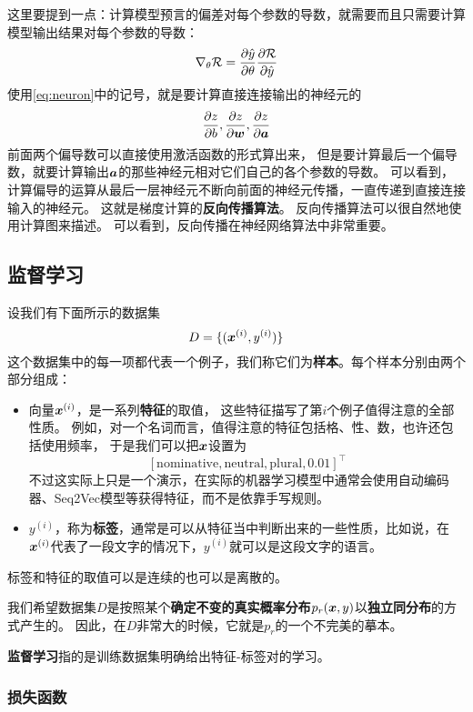 \documentclass[UTF8, a4paper]{ctexart}
\begin{document}
这里要提到一点：计算模型预言的偏差对每个参数的导数，就需要而且只需要计算模型输出结果对每个参数的导数：
\[
    \nabla_\theta \mathcal{R} = \pdv{\hat{y}}{\theta} \pdv{\mathcal{R}}{\hat{y}}
\]
使用\eqref{eq:neuron}中的记号，就是要计算直接连接输出的神经元的
\[
    \pdv{z}{b}, \pdv{z}{\vb*{w}}, \pdv{z}{\vb*{a}}
\]
前面两个偏导数可以直接使用激活函数的形式算出来，
但是要计算最后一个偏导数，就要计算输出$\vb*{a}$的那些神经元相对它们自己的各个参数的导数。
可以看到，计算偏导的运算从最后一层神经元不断向前面的神经元传播，一直传递到直接连接输入的神经元。
这就是梯度计算的\textbf{反向传播算法}。
反向传播算法可以很自然地使用计算图来描述。
可以看到，反向传播在神经网络算法中非常重要。

\hypertarget{sec:supervised-learning}{%
\subsection{监督学习}\label{sec:supervised-learning}}

设我们有下面所示的数据集
\[
D = \{(\vb*{x}^{(i)}, y^{(i)})\}
\]
这个数据集中的每一项都代表一个例子，我们称它们为\textbf{样本}。每个样本分别由两个部分组成：
\begin{itemize}
    \item 向量$\vb*{x}^{(i)}$，是一系列\textbf{特征}的取值，
    这些特征描写了第$i$个例子值得注意的全部性质。
    例如，对一个名词而言，值得注意的特征包括格、性、数，也许还包括使用频率，
    于是我们可以把$\vb*{x}$设置为
    \[
        [\text{nominative}, \text{neutral}, \text{plural}, 0.01]^\top
    \]
    不过这实际上只是一个演示，在实际的机器学习模型中通常会使用自动编码器、Seq2Vec模型等获得特征，而不是依靠手写规则。
    \item $y^{(i)}$，称为\textbf{标签}，通常是可以从特征当中判断出来的一些性质，比如说，在$\vb*{x}^{(i)}$代表了一段文字的情况下，$y^{(i)}$就可以是这段文字的语言。
\end{itemize}

标签和特征的取值可以是连续的也可以是离散的。

我们希望数据集$D$是按照某个\textbf{确定不变的真实概率分布}$p_r(\vb*{x}, y)$以\textbf{独立同分布}的方式产生的。
因此，在$D$非常大的时候，它就是$p_r$的一个不完美的摹本。

\textbf{监督学习}指的是训练数据集明确给出特征-标签对的学习。

\subsubsection{损失函数}
\end{document}
